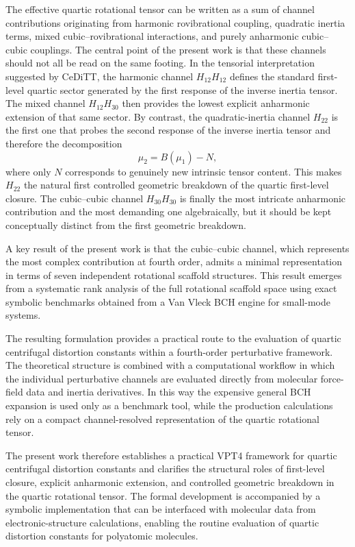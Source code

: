 \documentclass[aip,jcp,reprint]{revtex4-2}
\begin{document}
The effective quartic rotational tensor can be written as a sum of
channel contributions originating from harmonic rovibrational coupling,
quadratic inertia terms, mixed cubic--rovibrational interactions, and
purely anharmonic cubic--cubic couplings.
The central point of the present work is that these channels should not
all be read on the same footing. In the tensorial interpretation
suggested by CeDiTT, the harmonic channel $H_{12}H_{12}$ defines the
standard first-level quartic sector generated by the first response of
the inverse inertia tensor. The mixed channel $H_{12}H_{30}$ then
provides the lowest explicit anharmonic extension of that same sector.
By contrast, the quadratic-inertia channel $H_{22}$ is the first one
that probes the second response of the inverse inertia tensor and
therefore the decomposition
\begin{equation}
\mu_2 = B(\mu_1) - N,
\end{equation}
where only $N$ corresponds to genuinely new intrinsic tensor content.
This makes $H_{22}$ the natural first controlled geometric breakdown of
the quartic first-level closure. The cubic--cubic channel $H_{30}H_{30}$
is finally the most intricate anharmonic contribution and the most
demanding one algebraically, but it should be kept conceptually
distinct from the first geometric breakdown.

A key result of the present work is that the cubic--cubic channel,
which represents the most complex contribution at fourth order,
admits a minimal representation in terms of seven independent
rotational scaffold structures.
This result emerges from a systematic rank analysis of the full
rotational scaffold space using exact symbolic benchmarks obtained
from a Van Vleck BCH engine for small-mode systems.

The resulting formulation provides a practical route to the evaluation
of quartic centrifugal distortion constants within a fourth-order
perturbative framework.
The theoretical structure is combined with a computational workflow
in which the individual perturbative channels are evaluated directly
from molecular force-field data and inertia derivatives.
In this way the expensive general BCH expansion is used only as a
benchmark tool, while the production calculations rely on a compact
channel-resolved representation of the quartic rotational tensor.

The present work therefore establishes a practical VPT4 framework for
quartic centrifugal distortion constants and clarifies the structural
roles of first-level closure, explicit anharmonic extension, and
controlled geometric breakdown in the quartic rotational tensor.
The formal development is accompanied by a symbolic implementation that
can be interfaced with molecular data from electronic-structure
calculations, enabling the routine evaluation of quartic distortion
constants for polyatomic molecules.
\end{document}
